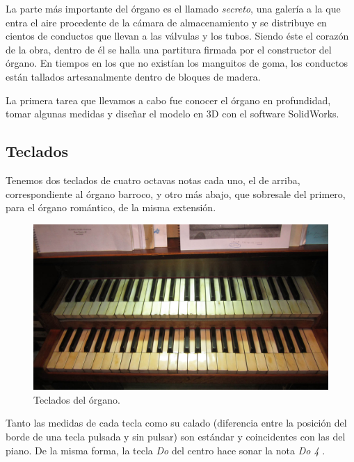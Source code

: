 \smallskip

La parte más importante del órgano es el llamado \textit{secreto}, una galería a la que entra el aire procedente de la cámara de almacenamiento y se distribuye en cientos de conductos que llevan a las válvulas y los tubos. Siendo éste el corazón de la obra, dentro de él se halla una partitura firmada por el constructor del órgano. En tiempos en los que no existían los manguitos de goma, los conductos están tallados artesanalmente dentro de bloques de madera.

La primera tarea que llevamos a cabo fue conocer el órgano en profundidad, tomar algunas medidas y diseñar el modelo en 3D con el software SolidWorks.

\subsection{Teclados}

Tenemos dos teclados de cuatro octavas notas cada uno, el de arriba, correspondiente al órgano barroco, y otro más abajo, que sobresale del primero, para el órgano romántico, de la misma extensión.

\smallskip

\begin{figure}[H]
	\noindent \begin{centering}
		\includegraphics[width=\linewidth*3/4]{capitulo3/teclados}
		\par\end{centering}
	\smallskip
	\caption{\label{fig:teclados} Teclados del órgano.}
\end{figure} 

\smallskip

Tanto las medidas de cada tecla como su calado (diferencia entre la posición del borde de una tecla pulsada y sin pulsar) son estándar y coincidentes con las del piano. De la misma forma, la tecla \textit{Do} del centro hace sonar la nota \textit{Do 4} \footnotemark.

